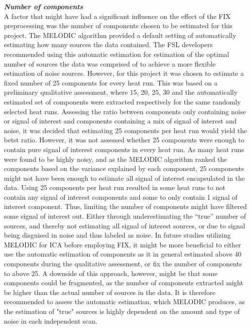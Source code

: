 \textit{\textbf{Number of components}}\\
A factor that might have had a significant influence on the effect of the FIX preprocessing was the number of components chosen to be estimated for this project. The MELODIC algorithm provided a default setting of automatically estimating how many sources the data contained. The FSL developers recommended using this automatic estimation for estimation of the optimal number of sources the data was comprised of to achieve a more flexible estimation of noise sources. However, for this project it was chosen to estimate a fixed number of 25 components for every heat run. This was based on a preliminary qualitative assessment, where 15, 20, 25, 30 and the automatically estimated set of components were extracted respectively for the same randomly selected heat runs. Assessing the ratio between components only containing noise or signal of interest and components containing a mix of signal of interest and noise, it was decided that estimating 25 components per heat run would yield the betst ratio. However, it was not assessed whether 25 components were enough to contain pure signal of interest components in every heat run. As many heat runs were found to be highly noisy, and as the MELODIC algorithm ranked the components based on the variance explained by each component, 25 components might not have been enough to estimate all signal of interest encapsulated in the data. Using 25 components per heat run resulted in some heat runs to not contain any signal of interest components and some to only contain 1 signal of interest component. Thus, limiting the number of components might have filtered some signal of interest out. Either through underestimating the “true” number of sources, and thereby not estimating all signal of interest sources, or due to signal being disguised in noise and thus labeled as noise. In future studies utilizing MELODIC for ICA before employing FIX, it might be more beneficial to either use the automatic estimation of components as it in general estimated above 40 components during the qualitative assessment, or fix the number of components to above 25. A downside of this approach, however, might be that some components could be fragmented, as the number of components extracted might be higher than the actual number of sources in the data. It is therefore recommended to assess the automatic estimation, which MELODIC produces, as the estimation of "true" sources is highly dependent on the amount and type of noise in each independent scan. \\

